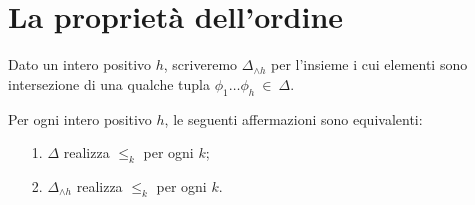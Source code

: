\section{La propriet\`a dell'ordine}

Dato un intero positivo $h$, scriveremo \emph{$\Delta_{\wedge h}$\/} per l'insieme i cui elementi sono intersezione di una qualche tupla $\phi_1\dots \phi_h\ \in\ \Delta$. 

\begin{lemma}\label{lem_ramsey} Per ogni intero positivo $h$, le seguenti affermazioni sono equivalenti:
\begin{itemize}
\item[1.] $\Delta$ realizza $\le_k$ per ogni $k$;
\item[2.] $\Delta_{\wedge h}$ realizza $\le_k$ per ogni $k$.
\end{itemize}
\end{lemma}

